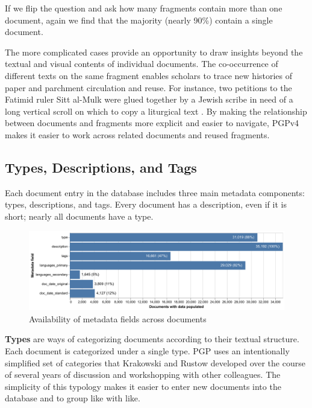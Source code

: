 \documentclass{article}
\begin{document}

If we flip the question and ask how many fragments contain more than one document, again we find that the majority (nearly 90\%) contain a single document.

The more complicated cases provide an opportunity to draw insights beyond the textual and visual contents of individual documents. The co-occurrence of different texts on the same fragment enables scholars to trace new histories of paper and parchment circulation and reuse. For instance, two petitions to the Fatimid ruler Sitt al-Mulk \autocite{noauthor_state_1024, noauthor_state_1021} were glued together by a Jewish scribe in need of a long vertical scroll on which to copy a liturgical text . By making the relationship between documents and fragments more explicit and easier to navigate, PGPv4 makes it easier to work across related documents and reused fragments.

\subsection{Types, Descriptions, and Tags}

Each document entry in the database includes three main metadata components: types, descriptions, and tags. Every document has a description, even if it is short; nearly all documents have a type.

\begin{figure}[!hbt]
    \centering
    \includegraphics[width=1.0\linewidth]{charts/metadata_available.pdf}
    \caption{Availability of metadata fields across documents}
    \label{fig:metadata-status}
\end{figure}

\textbf{Types} are ways of categorizing documents according to their textual structure. Each document is categorized under a single type. PGP uses an intentionally simplified set of categories that Krakowski and Rustow developed over the course of several years of discussion and workshopping with other colleagues. The simplicity of this typology makes it easier to enter new documents into the database and to group like with like. 
\end{document}
